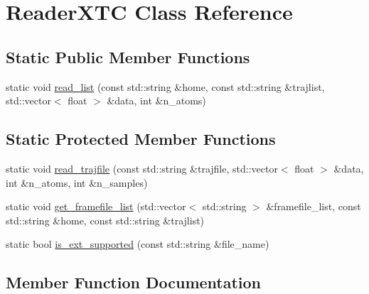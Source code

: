 \hypertarget{classReaderXTC}{}\section{Reader\+X\+T\+C Class Reference}
\label{classReaderXTC}
\subsection*{Static Public Member Functions}
\begin{DoxyCompactItemize}
\item 
static void \hyperlink{classReaderXTC_a141579a0c30c07c024c579b7d7cc7c06}{read\+\_\+list} (const std\+::string \&home, const std\+::string \&trajlist, std\+::vector$<$ float $>$ \&data, int \&n\+\_\+atoms)
\end{DoxyCompactItemize}
\subsection*{Static Protected Member Functions}
\begin{DoxyCompactItemize}
\item 
static void \hyperlink{classReaderXTC_a969d592c1cf53ce8716c34158879bb1c}{read\+\_\+trajfile} (const std\+::string \&trajfile, std\+::vector$<$ float $>$ \&data, int \&n\+\_\+atoms, int \&n\+\_\+samples)
\item 
static void \hyperlink{classReaderXTC_a467a29f9ea2294ef5785632719a5d4d3}{get\+\_\+framefile\+\_\+list} (std\+::vector$<$ std\+::string $>$ \&framefile\+\_\+list, const std\+::string \&home, const std\+::string \&trajlist)
\item 
static bool \hyperlink{classReaderXTC_a864850b4467d829587821d2304ef5809}{is\+\_\+ext\+\_\+supported} (const std\+::string \&file\+\_\+name)
\end{DoxyCompactItemize}


\subsection{Member Function Documentation}
\hypertarget{classReaderXTC_a467a29f9ea2294ef5785632719a5d4d3}{}
